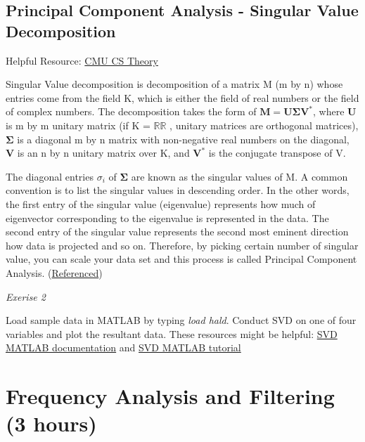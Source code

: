 \documentclass{tufte-handout}
\begin{document}
\subsection{Principal Component Analysis - Singular Value Decomposition}
Helpful Resource: 
\href{https://www.cs.cmu.edu/~venkatg/teaching/CStheory-infoage/book-chapter-4.pdf}{CMU CS Theory}

Singular Value decomposition is decomposition of a matrix M (m by n) whose entries come from the field K, which is either the field of real numbers or the field of complex numbers. The decomposition takes the form of ${\displaystyle \mathbf {M} =\mathbf {U} {\boldsymbol {\Sigma }}\mathbf {V} ^{*}}$, where $\mathbf{U}$ is m by m unitary matrix (if  K = ${\displaystyle \mathbb {R} } \mathbb {R}$ , unitary matrices are orthogonal matrices), $\boldsymbol{{\Sigma}}$ is a diagonal m by n matrix with non-negative real numbers on the diagonal, $\mathbf{V}$ is an n by n unitary matrix over K, and
$\mathbf{{V}^{*}}$ is the conjugate transpose of V.

The diagonal entries ${\sigma_{i}}$ of $\mathbf{\Sigma}$ are known as the singular values of M. A common convention is to list the singular values in descending order. In the other words, the first entry of the singular value (eigenvalue) represents how much of eigenvector corresponding to the eigenvalue is represented in the data. The second entry of the singular value represents the second most eminent direction how data is projected and so on. Therefore, by picking certain number of singular value, you can scale your data set and this process is called Principal Component Analysis. (\href{https://en.wikipedia.org/wiki/Singular-value_decomposition}{Referenced})



\textit{Exerise 2}

Load sample data in MATLAB by typing \textit{load hald}. Conduct SVD on one of four variables and plot the resultant data. These resources might be helpful: \href{https://www.mathworks.com/help/matlab/ref/svd.html}{SVD MATLAB documentation} and \href{http://www.matrixlab-examples.com/singular-value-decomposition.html}{SVD MATLAB tutorial}




\section{Frequency Analysis and Filtering (3 hours)}
\end{document}
